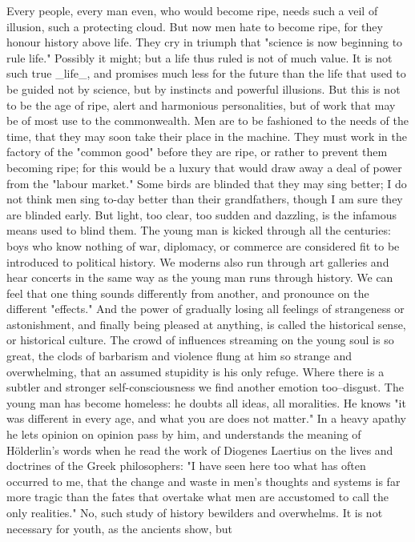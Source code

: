 Every people, every man even, who would become ripe, needs such a
veil of illusion, such a protecting cloud. But now men hate to become
ripe, for they honour history above life. They cry in triumph that
"science is now beginning to rule life." Possibly it might; but a
life thus ruled is not of much value. It is not such true _life_, and
promises much less for the future than the life that used to be
guided not by science, but by instincts and powerful illusions. But
this is not to be the age of ripe, alert and harmonious
personalities, but of work that may be of most use to the
commonwealth. Men are to be fashioned to the needs of the time, that
they may soon take their place in the machine. They must work in the
factory of the "common good" before they are ripe, or rather to
prevent them becoming ripe; for this would be a luxury that would
draw away a deal of power from the "labour market." Some birds are
blinded that they may sing better; I do not think men sing to-day
better than their grandfathers, though I am sure they are blinded
early. But light, too clear, too sudden and dazzling, is the infamous
means used to blind them. The young man is kicked through all the
centuries: boys who know nothing of war, diplomacy, or commerce are
considered fit to be introduced to political history. We moderns also
run through art galleries and hear concerts in the same way as the
young man runs through history. We can feel that one thing sounds
differently from another, and pronounce on the different "effects."
And the power of gradually losing all feelings of strangeness or
astonishment, and finally being pleased at anything, is called the
historical sense, or historical culture. The crowd of influences
streaming on the young soul is so great, the clods of barbarism and
violence flung at him so strange and overwhelming, that an assumed
stupidity is his only refuge. Where there is a subtler and stronger
self-consciousness we find another emotion too--disgust. The young
man has become homeless: he doubts all ideas, all moralities. He
knows "it was different in every age, and what you are does not
matter." In a heavy apathy he lets opinion on opinion pass by him,
and understands the meaning of Hölderlin's words when he read the
work of Diogenes Laertius on the lives and doctrines of the Greek
philosophers: "I have seen here too what has often occurred to me,
that the change and waste in men's thoughts and systems is far more
tragic than the fates that overtake what men are accustomed to call
the only realities." No, such study of history bewilders and
overwhelms. It is not necessary for youth, as the ancients show, but
